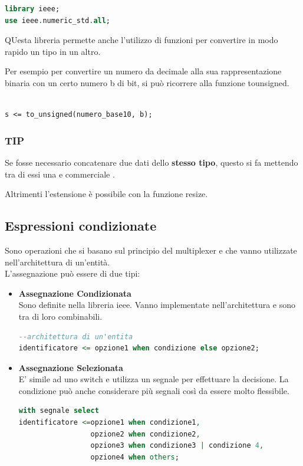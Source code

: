 \documentclass[a4paper]{book}
\begin{document}
\begin{lstlisting}[language=VHDL]
library ieee;
use ieee.numeric_std.all;
\end{lstlisting}

QUesta libreria permette anche l'utilizzo di funzioni per convertire in modo rapido un tipo in un altro.

Per esempio per convertire un numero da decimale alla sua rappresentazione binaria con un certo numero b di bit, si può ricorrere alla funzione to\textunderscore unsigned.

\begin{lstlisting}

s <= to_unsigned(numero_base10, b);

\end{lstlisting}

\subsubsection{TIP}
Se fosse necessario concatenare due dati dello \textbf{stesso tipo}, questo si fa mettendo tra di essi una e commerciale .

Altrimenti l'estensione è possibile con la funzione resize.

\subsection{Espressioni condizionate}

Sono operazioni che si basano sul principio del multiplexer e che vanno utilizzate nell'architettura di un'entità.\\
L'assegnazione può essere di due tipi:

\begin{itemize}
\item\textbf{Assegnazione Condizionata}\\
Sono definite nella libreria ieee.
Vanno implementate nell'architettura e sono tra di loro combinabili.
\begin{lstlisting}[language = VHDL]
--architettura di un'entita
identificatore <= opzione1 when condizione else opzione2;
\end{lstlisting}
\item\textbf{Assegnazione Selezionata}\\
E' simile ad uno switch e utilizza un segnale per effettuare la decisione.
La condizione può anche considerare più segnali così da essere molto flessibile.

\begin{lstlisting}[language=VHDL]
with segnale select
identificatore <=opzione1 when condizione1,
                 opzione2 when condizione2,
                 opzione3 when condizione3 | condizione 4,
                 opzione4 when others;
\end{lstlisting}
\end{itemize}
\end{document}
